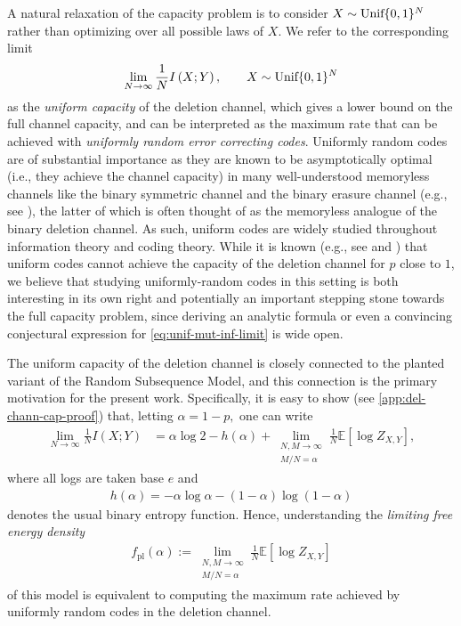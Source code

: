 \documentclass[11pt]{amsart}
\numberwithin{equation}{section}
\numberwithin{equation}{section}
\newcommand{\1}{\mathbbm{1}}
\newcommand{\E}{\mathbb{E}}
\newcommand{\Unif}{\textup{Unif}}
\newcommand{\fpl}{f_{\mathrm{pl}}}
\theoremstyle{definition}
\begin{document}
A natural relaxation of the capacity problem is to consider $X\sim \Unif\{0,1\}^N$ rather than optimizing over all possible laws of $X.$ We refer to the corresponding limit
\begin{align}\label{eq:unif-mut-inf-limit}
    \lim_{N\to\infty}\frac{1}{N} I\left( X; Y \right), \qquad X\sim \Unif\{0,1\}^N
\end{align}
as the \emph{uniform capacity} of the deletion channel, which gives a lower bound on the full channel capacity, and can be interpreted as the maximum rate that can be achieved with \emph{uniformly random error correcting codes}. Uniformly random codes are of substantial importance as they are known to be asymptotically optimal (i.e., they achieve the channel capacity) in many well-understood memoryless channels like the binary symmetric channel and the binary erasure channel (e.g., see \cite{shannon1948mathematical}), the latter of which is often thought of as the memoryless analogue of the binary deletion channel. As such, uniform codes are widely studied throughout information theory and coding theory. While it is known (e.g., see \cite{drmota2012mutual} and \cite{drinea2006simple}) that uniform codes cannot achieve the capacity of the deletion channel for $p$ close to $1$, we believe that studying uniformly-random codes in this setting is both interesting in its own right and potentially an important stepping stone towards the full capacity problem, since deriving an analytic formula or even a convincing conjectural expression for \eqref{eq:unif-mut-inf-limit} is wide open.

The uniform capacity of the deletion channel is closely connected to the planted variant of the Random Subsequence Model, and this connection is the primary motivation for the present work. Specifically, it is easy to show (see \cref{app:del-chann-cap-proof}) that, letting $\alpha = 1-p,$ one can write
\begin{align} \label{eq:del-chann-cap-connection}
    \lim_{N\to \infty} \frac{1}{N}I(X;Y) &= \alpha \log 2 - h(\alpha) + \lim_{\substack{N,M\to\infty \\ M/N = \alpha}} \frac{1}{N}\E\left[ \log Z_{X,Y} \right],
\end{align}
where all logs are taken base $e$ and 
\begin{align*}
    h(\alpha) = -\alpha \log \alpha - (1-\alpha)\log (1-\alpha)
\end{align*}
denotes the usual binary entropy function. Hence, understanding the \emph{limiting free energy density} 
\begin{align*}
    \fpl(\alpha) := \lim_{\substack{N,M\to\infty \\ M/N = \alpha}} \frac{1}{N}\E\left[ \log Z_{X,Y} \right]
\end{align*}
of this model is equivalent to computing the maximum rate achieved by uniformly random codes in the deletion channel.
\end{document}
